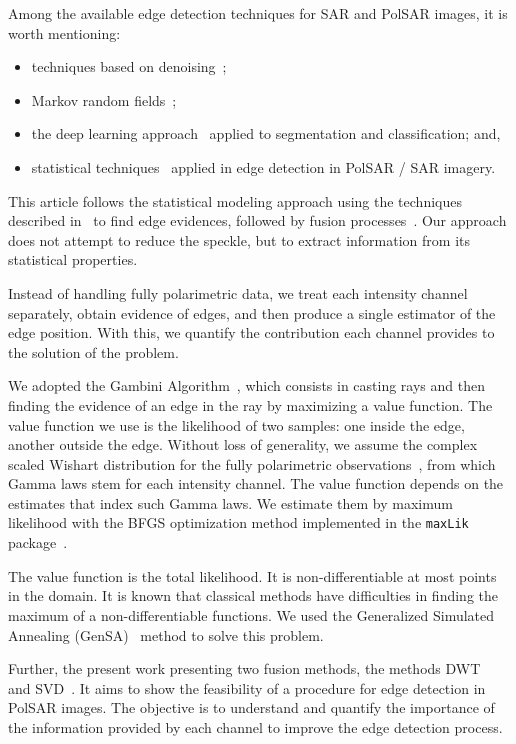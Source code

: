 \documentclass[journal]{IEEEtran}
\begin{document}
Among the available edge detection techniques for SAR and PolSAR images, it is worth mentioning:
\begin{itemize}
\item techniques based on denoising~\cite{sjx, lzly, wxbzw, law, cgaf};   
\item Markov random fields~\cite{bf};	
\item the deep learning approach~\cite{bac, ztmxzxf} applied to segmentation and classification; and,
\item statistical techniques~\cite{gmbf, fbgm, nhfc} applied in edge detection in PolSAR / SAR imagery.
\end{itemize}

This article follows the statistical modeling approach using the techniques described in~\cite{gmbf, fbgm, nhfc} to find edge evidences, followed by fusion processes~\cite{mit, bmf_2019}. 
Our approach does not attempt to reduce the speckle, but to extract information from its statistical properties.

Instead of handling fully polarimetric data, we treat each intensity channel separately, obtain evidence of edges, and then produce a single estimator of the edge position.
With this, we quantify the contribution each channel provides to the solution of the problem.

We adopted the Gambini Algorithm~\cite{gmbf_sc}, which consists in casting rays and then finding the evidence of an edge in the ray by maximizing a value function.
The value function we use is the likelihood of two samples: one inside the edge, another outside the edge.
Without loss of generality, we assume the complex scaled Wishart distribution for the fully polarimetric observations~\cite{ade}, from which Gamma laws stem for each intensity channel.
The value function depends on the estimates that index such Gamma laws.
We estimate them by maximum likelihood with the BFGS optimization method implemented in the \texttt{maxLik} package~\cite{ht}.

The value function is the total likelihood.
It is non-differentiable at most points in the domain. 
It is known that classical methods have difficulties in finding the maximum of a non-differentiable functions. 
We used the Generalized Simulated Annealing (GenSA)~\cite{xgsh} method to solve this problem. 
 
Further, the present work presenting two fusion methods, the methods DWT~\cite{n_r} and SVD~\cite{naidu}. It aims to show the feasibility of a procedure for edge detection in PolSAR images. The objective is to understand and quantify the importance of the information provided by each channel to improve the edge detection process.
\end{document}
